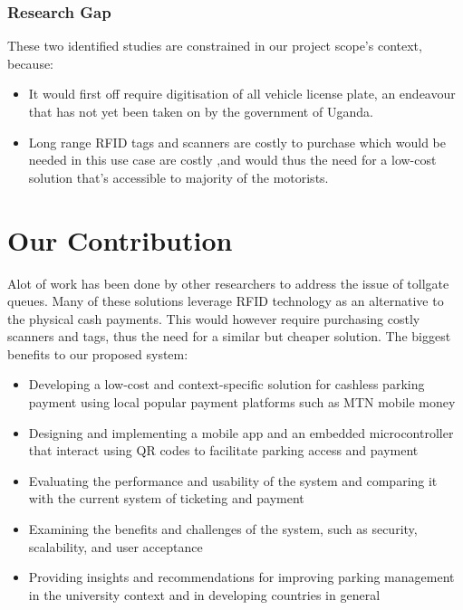 \subsubsection{Research Gap}
These two identified studies are constrained in our project scope’s context, because:
\begin{itemize}
    \item It would first off require digitisation of all vehicle license plate, an endeavour that has not yet been taken on by the government of Uganda.
    \item Long range RFID tags and scanners are costly to purchase which would be needed in this use case are costly ,and would thus the need for a low-cost solution that’s accessible to majority of the motorists.
\end{itemize}



\clearpage


\section{Our Contribution}
Alot of work has been done by other researchers to address the issue of tollgate queues. Many of these solutions leverage RFID technology as an alternative to the physical cash payments. This would however require purchasing costly scanners and tags, thus the need for a similar but cheaper solution.
The biggest benefits to our proposed system:
\begin{itemize}
    \item Developing a low-cost and context-specific solution for cashless parking payment using local popular payment platforms such as MTN mobile money
    \item Designing and implementing a mobile app and an embedded microcontroller that interact using QR codes to facilitate parking access and payment
    \item Evaluating the performance and usability of the system and comparing it with the current system of ticketing and payment
    \item Examining the benefits and challenges of the system, such as security, scalability, and user acceptance
    \item Providing insights and recommendations for improving parking management in the university context and in developing countries in general
\end{itemize}

